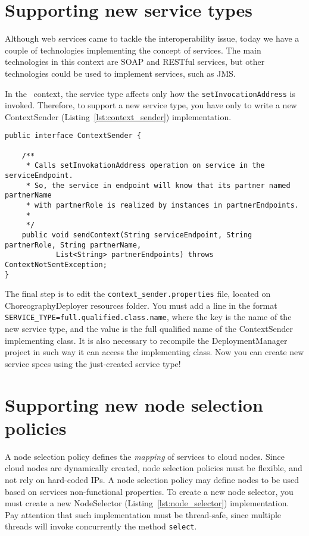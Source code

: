 \section{Supporting new service types}

Although web services came to tackle the interoperability issue, today we have a couple of technologies implementing the concept of services.
The main technologies in this context are SOAP and RESTful services, but other technologies could be used to implement services, such as JMS.

In the \ee\ context, the service type affects only how the \texttt{setInvocationAddress} is invoked.
Therefore, to support a new service type, you have only to write a new \textsf{ContextSender} (Listing~\ref{lst:context_sender}) implementation.

{\footnotesize
\begin{lstlisting}[caption=\textsf{ContextSender} interface, label=lst:context_sender]
public interface ContextSender {

    /**
     * Calls setInvokationAddress operation on service in the serviceEndpoint.
     * So, the service in endpoint will know that its partner named partnerName
     * with partnerRole is realized by instances in partnerEndpoints.
     * 
     */
    public void sendContext(String serviceEndpoint, String partnerRole, String partnerName,
            List<String> partnerEndpoints) throws ContextNotSentException;
}
\end{lstlisting}
}

The final step is to edit the \texttt{context\_sender.properties} file, located on ChoreographyDeployer resources folder. You must add a line in the format \verb!SERVICE_TYPE=full.qualified.class.name!, where the key is the name of the new service type, and the value is the full qualified name of the \textsf{ContextSender} implementing class. It is also necessary to recompile the DeploymentManager project in such way it can access the implementing class. Now you can create new service specs using the just-created service type!

\section{Supporting new node selection policies}

A node selection policy defines the \emph{mapping} of services to cloud nodes.
Since cloud nodes are dynamically created, node selection policies must be flexible, and not rely on hard-coded IPs.
A node selection policy may define nodes to be used based on services non-functional properties.
To create a new node selector, you must create a new \textsf{NodeSelector} (Listing~\ref{lst:node_selector}) implementation.
Pay attention that such implementation must be thread-safe, since multiple threads will invoke concurrently the method \texttt{select}.

